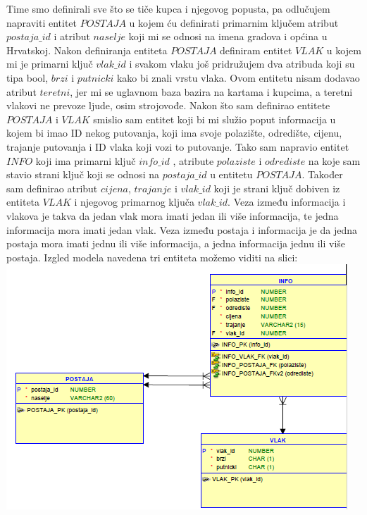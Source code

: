 \documentclass{OM_style}
\begin{document}
Time smo definirali sve što se tiče kupca i njegovog popusta, pa odlučujem napraviti entitet $POSTAJA$ u kojem ću definirati primarnim ključem atribut $postaja\_id$ i atribut $naselje$ koji mi se odnosi na imena gradova i općina u Hrvatskoj. Nakon definiranja entiteta $POSTAJA$ definiram entitet $VLAK$ u kojem mi je primarni ključ $vlak\_id$ i svakom vlaku još pridružujem dva atribuda koji su tipa bool, $brzi$ i $putnicki$ kako bi znali vrstu vlaka. Ovom entitetu nisam dodavao atribut $teretni$, jer mi se uglavnom baza bazira na kartama i kupcima, a teretni vlakovi ne prevoze ljude, osim strojovođe. Nakon što sam definirao entitete $POSTAJA$ i $VLAK$ smislio sam entitet koji bi mi služio poput informacija u kojem bi imao ID nekog putovanja, koji ima svoje polazište, odredište, cijenu, trajanje putovanja i ID vlaka koji vozi to putovanje. Tako sam napravio entitet $INFO$ koji ima primarni ključ $info\_id$ , atribute $polaziste$ i $odrediste$ na koje sam stavio strani ključ koji se odnosi na $postaja\_id$ u entitetu $POSTAJA$. Također sam definirao atribut $cijena$, $trajanje$ i $vlak\_id$ koji je strani ključ dobiven iz entiteta $VLAK$ i njegovog primarnog ključa $vlak\_id$. Veza između informacija i vlakova je takva da jedan vlak mora imati jedan ili više informacija, te jedna informacija mora imati jedan vlak. Veza između postaja i informacija je da jedna postaja mora imati jednu ili više informacija, a jedna informacija jednu ili više postaja. Izgled modela navedena tri entiteta možemo viditi na slici: \\

\phantom{...........} \includegraphics{postinfovlak} \\
\end{document}
